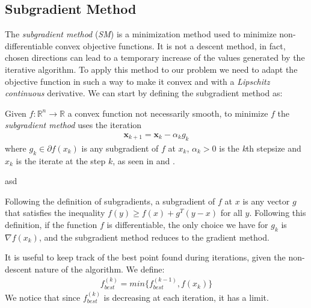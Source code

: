 \subsection{Subgradient Method}
The \textit{subgradient method} (\textit{SM}) is a minimization method used to minimize non-differentiable convex objective functions. It is not a descent method, in fact, chosen directions can lead to a temporary increase of the values generated by the iterative algorithm. To apply this method to our problem we need to adapt the objective function in such a way to make it convex and with a \textit{Lipschitz continuous} derivative.
We can start by defining the subgradient method as:

Given $f: \mathbb{R}^n \rightarrow \mathbb{R}$ a convex function not necessarily smooth, to minimize $f$ the \textit{subgradient method} uses the iteration
\begin{align*}
    \mathbf{x}_{k+1} = \mathbf{x}_k - \alpha_k {g}_k
\end{align*}
where $g_k \in \partial f(x_k)$ is any subgradient of $f$ at $x_k$, $\alpha_k > 0$ is the \textit{k}th stepsize and $x_k$ is the iterate at the step $k$, as seen in \parencite[Chap. 1]{subgrad_boyd} and \cite{notes_subgrad}. 

\begin{definition}
asd
\end{definition}

Following the definition of subgradients, a subgradient of $f$ at $x$ is any vector $g$ that satisfies the inequality ${f(y)\geq f(x) + g^T (y-x)}$ for all $y$. Following this definition, if the function $f$ is differentiable, the only choice we have for $g_k$ is $\nabla f(x_k)$, and the subgradient method reduces to the gradient method.

It is useful to keep track of the best point found during iterations, given the non-descent nature of the algorithm. We define:
\begin{align*}
    f_{best}^{(k)} = min\{f_{best}^{(k-1)}, f(x_k)\}
\end{align*}
We notice that since $f_{best}^{(k)}$ is decreasing at each iteration, it has a limit.

